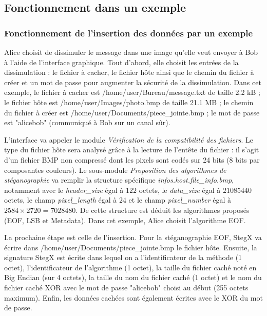 \documentclass[11pt]{article}
\begin{document}
\subsection{Fonctionnement dans un exemple}

\subsubsection{Fonctionnement de l'insertion des données par un exemple}

Alice choisit de dissimuler le message dans une image qu'elle veut envoyer 
à Bob à l'aide de l'interface graphique. 
Tout d'abord, elle choisit les entrées de la dissimulation : le fichier 
à cacher, le fichier hôte ainsi que le chemin du fichier à créer et un mot 
de passe pour augmenter la sécurité de la dissimulation. 
Dans cet exemple, le fichier à cacher est /home/user/Bureau/message.txt 
de taille 2.2 kB ; le fichier hôte est /home/user/Images/photo.bmp 
de taille 21.1 MB ; le chemin du fichier à créer est 
/home/user/Documents/piece\_jointe.bmp ; le mot de passe est "alicebob" 
(communiqué à Bob sur un canal sûr). 

L'interface va appeler le module \textit{Vérification de la compatibilité 
des fichiers}. Le type du fichier hôte sera analysé grâce à la lecture 
de l'entête du fichier : il s'agit d'un fichier BMP non compressé dont les 
pixels sont codés sur 24 bits (8 bits par composantes couleurs). 
Le sous-module \textit{Proposition des algorithmes de stéganographie} va 
remplir la structure spécifique 
\textit{infos.host.file\_info.bmp}, notamment avec le 
\textit{header\_size} égal à $122$ octets, le \textit{data\_size} égal à 
$21085440$ octets, le champ \textit{pixel\_length} égal à $24$ et le champ 
\textit{pixel\_number} égal à $2584 \times 2720 = 7028480$. De cette structure
est déduit les algorithmes proposés (EOF, LSB et Metadata). 
Dans cet exemple, Alice choisit l'algorithme EOF. 

La prochaine étape est celle de l'insertion. Pour la stéganographie EOF, 
StegX va écrire dans /home/user/Documents/piece\_jointe.bmp le fichier hôte. 
Ensuite, la signature StegX est écrite dans lequel on a l'identificateur 
de la méthode (1 octet), l'identificateur de l'algorithme (1 octet), la 
taille du fichier caché noté en Big Endian (sur 4 octets), la taille du 
nom du fichier caché (1 octet) et le nom du fichier caché XOR avec le mot 
de passe "alicebob" choisi au début (255 octets maximum). 
Enfin, les données cachées sont également écrites avec le XOR du mot de passe. 
\end{document}
